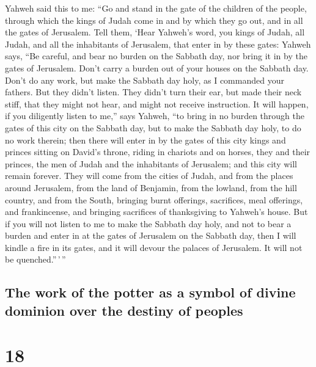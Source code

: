  Yahweh said this to me: ``Go and stand in the gate of
the children of the people, through which the kings of Judah come in and
by which they go out, and in all the gates of Jerusalem. 
Tell them, `Hear Yahweh's word, you kings of Judah, all Judah, and all
the inhabitants of Jerusalem, that enter in by these gates:
 Yahweh says, ``Be careful, and bear no burden on the
Sabbath day, nor bring it in by the gates of Jerusalem. 
Don't carry a burden out of your houses on the Sabbath day. Don't do any
work, but make the Sabbath day holy, as I commanded your fathers.
 But they didn't listen. They didn't turn their ear, but
made their neck stiff, that they might not hear, and might not receive
instruction.  It will happen, if you diligently listen to
me,'' says Yahweh, ``to bring in no burden through the gates of this
city on the Sabbath day, but to make the Sabbath day holy, to do no work
therein;  then there will enter in by the gates of this
city kings and princes sitting on David's throne, riding in chariots and
on horses, they and their princes, the men of Judah and the inhabitants
of Jerusalem; and this city will remain forever.  They
will come from the cities of Judah, and from the places around
Jerusalem, from the land of Benjamin, from the lowland, from the hill
country, and from the South, bringing burnt offerings, sacrifices, meal
offerings, and frankincense, and bringing sacrifices of thanksgiving to
Yahweh's house.  But if you will not listen to me to make
the Sabbath day holy, and not to bear a burden and enter in at the gates
of Jerusalem on the Sabbath day, then I will kindle a fire in its gates,
and it will devour the palaces of Jerusalem. It will not be
quenched.''\,'\,''

\hypertarget{the-work-of-the-potter-as-a-symbol-of-divine-dominion-over-the-destiny-of-peoples}{%
\subsection{The work of the potter as a symbol of divine dominion over
the destiny of
peoples}\label{the-work-of-the-potter-as-a-symbol-of-divine-dominion-over-the-destiny-of-peoples}}

\hypertarget{section-17}{%
\section{18}\label{section-17}}

